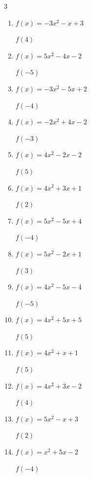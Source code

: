 \begin{multicols}{3}
\begin{enumerate}
\columnbreak %

  \item $f(x)=-3x^{2}-x+3$

$f(4)$
        \phantom{$= -49$}

  \item $f(x)=5x^{2}-4x-2$

$f(-5)$
        \phantom{$= 143$}

  \item $f(x)=-3x^{2}-5x+2$

$f(-4)$
        \phantom{$= -26$}

  \item $f(x)=-2x^{2}+4x-2$

$f(-3)$
        \phantom{$= -32$}

  \item $f(x)=4x^{2}-2x-2$

$f(5)$
        \phantom{$= 88$}

  \item $f(x)=4x^{2}+3x+1$

$f(2)$
        \phantom{$= 23$}

  \item $f(x)=5x^{2}-5x+4$

$f(-4)$
        \phantom{$= 104$}

  \item $f(x)=5x^{2}-2x+1$

$f(3)$
        \phantom{$= 40$}

  \item $f(x)=4x^{2}-5x-4$

$f(-5)$
        \phantom{$= 121$}

  \item $f(x)=4x^{2}+5x+5$

$f(5)$
        \phantom{$= 130$}

  \item $f(x)=4x^{2}+x+1$

$f(5)$
        \phantom{$= 106$}

  \item $f(x)=4x^{2}+3x-2$

$f(4)$
        \phantom{$= 74$}

  \item $f(x)=5x^{2}-x+3$

$f(2)$
        \phantom{$= 21$}

  \item $f(x)=x^{2}+5x-2$

$f(-4)$
        \phantom{$= -6$}


\end{enumerate}
\end{multicols}
